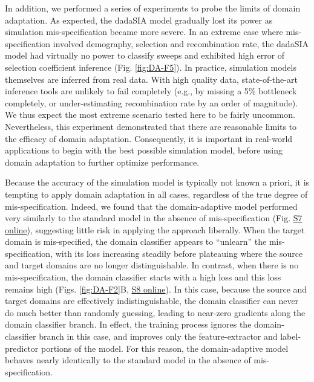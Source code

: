 In addition, we performed a series of experiments to probe the limits of domain adaptation. As expected, the \ac{dadaSIA} model gradually lost its power as simulation mis-specification became more severe. In an extreme case where mis-specification involved demography, selection and recombination rate, the \ac{dadaSIA} model had virtually no power to classify sweeps and exhibited high error of selection coefficient inference (Fig. \ref{fig:DA-F5}). In practice, simulation models themselves are inferred from real data. With high quality data, state-of-the-art inference tools are unlikely to fail completely (e.g., by missing a 5\% bottleneck completely, or under-estimating recombination rate by an order of magnitude). We thus expect the most extreme scenario tested here to be fairly uncommon. Nevertheless, this experiment demonstrated that there are reasonable limits to the efficacy of domain adaptation. Consequently, it is important in real-world applications to begin with the best possible simulation model, before using domain adaptation to further optimize performance.

Because the accuracy of the simulation model is typically not known a priori, it is tempting to apply domain adaptation in all cases, regardless of the true degree of mis-specification. Indeed, we found that the domain-adaptive model performed very similarly to the standard model in the absence of mis-specification (Fig. \href{https://journals.plos.org/plosgenetics/article?id=10.1371/journal.pgen.1011032#sec018}{S7 online}), suggesting little risk in applying the approach liberally. When the target domain is mis-specified, the domain classifier appears to “unlearn” the mis-specification, with its loss increasing steadily before plateauing where the source and target domains are no longer distinguishable. In contrast, when there is no mis-specification, the domain classifier starts with a high loss and this loss remains high (Figs. \ref{fig:DA-F2}B, \href{https://journals.plos.org/plosgenetics/article?id=10.1371/journal.pgen.1011032#sec018}{S8 online}). In this case, because the source and target domains are effectively indistinguishable, the domain classifier can never do much better than randomly guessing, leading to near-zero gradients along the domain classifier branch. In effect, the training process ignores the domain-classifier branch in this case, and improves only the feature-extractor and label-predictor portions of the model. For this reason, the domain-adaptive model behaves nearly identically to the standard model in the absence of mis-specification.

